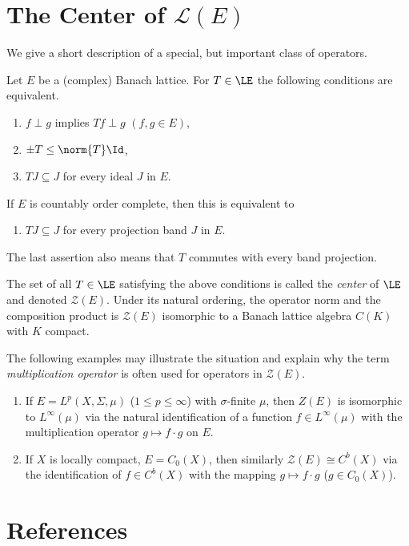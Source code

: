 \section{The Center of 
\texorpdfstring{$\mathcal{L}(E)$}{L(E)}}\label{sec:c1-9}
%
We give a short description of a special, but important class of operators.

Let $ E $ be a (complex) Banach lattice.
For $ T \in \LE $ the following conditions are equivalent.
\begin{enumerate}[\upshape (a)]

    \item 
    $ f \perp g $ implies $ Tf \perp g $ \quad $(f, g \in E)$,
    
    \item 
    $ \pm T \leq \norm{T} \Id $,
    
    \item 
    $ TJ \subseteq J $ for every ideal $ J $ in $ E $.
    
\end{enumerate}
If\/ $ E $ is countably order complete, then this is equivalent to
\begin{enumerate}
    \item 
    $ TJ \subseteq J $ for every projection band $ J $ in $ E $.
\end{enumerate}
The last assertion also means that $ T $ commutes with every band projection.

The set of all $ T \in \LE $ satisfying the above conditions is called the \emph{center} of\/ $ \LE $ and denoted 
$ \mathcal{Z}(E) $.
Under its natural ordering, the operator norm and the composition product is $ \mathcal{Z}(E) $ isomorphic to a Banach lattice algebra $ C(K) $ with $ K $ compact.

The following examples may illustrate the situation and explain why the term \emph{multiplication operator} is often used for operators in $ \mathcal{Z}(E) $.
\begin{enumerate}[\upshape (i), wide, labelindent=.25em]
\item 
If\/ $ E = L^{p}(X,\Sigma,\mu) $ ($ 1 \leq p \leq \infty $) with $ \sigma $-finite $ \mu $, then $ Z(E) $ is isomorphic to $ L^{\infty}(\mu) $ via the natural identification of a function $ f \in L^{\infty}(\mu) $ with the multiplication operator $ g \mapsto f\cdot g $ on $ E $. 

\item 
If\/ $ X $ is locally compact, $ E = C_{0}(X) $, then similarly $ \mathcal{Z}(E) \cong C^{b}(X) $ via the identification of\/ $ f \in C^{b}(X) $ with the mapping $ g \mapsto f\cdot g $ ($ g \in C_{0}(X) $).
\end{enumerate}
\section*{References}
{\RaggedRight
  \printbibliography[heading=none]
 }